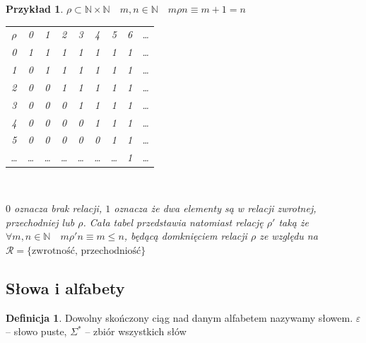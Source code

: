 \documentclass[12pt,a4paper]{article}
\newtheorem{przyklad}{Przykład}
\theoremstyle{definition}
\newtheorem{df}{Definicja}
\begin{document}
\begin{przyklad}
	$\rho \subset \mathbb{N}\times\mathbb{N} \quad m,n \in \mathbb{N} \quad m\rho n \equiv m +1 = n$ \\
	\begin{center}
	\begin{tabular}{ccccccccc}
		$\rho$ & 0 & 1 & 2 & 3 & 4 & 5 & 6 & \dots \\
			0  & {\color{red}1} & {\color{blue}1} & {\color{green}1}  & {\color{green}1}  & {\color{green}1}  & {\color{green}1}  & {\color{green}1}  & \dots \\
			1  & {\color{yellow}0}  & {\color{red}1}  & {\color{blue}1} & {\color{green}1}  & {\color{green}1}  & {\color{green}1}  & {\color{green}1}  & \dots \\
			2  & {\color{yellow}0}  & {\color{yellow}0}  & {\color{red}1}  & {\color{blue}1} & {\color{green}1}  &  {\color{green}1} & {\color{green}1}  & \dots \\
			3  & {\color{yellow}0}  & {\color{yellow}0}  & {\color{yellow}0}  & {\color{red}1}  & {\color{blue}1} & {\color{green}1}  & {\color{green}1}  & \dots \\
			4  & {\color{yellow}0}  & {\color{yellow}0}  & {\color{yellow}0}  & {\color{yellow}0}  & {\color{red}1}  & {\color{blue}1} & {\color{green}1}  & \dots \\
			5  & {\color{yellow}0}  & {\color{yellow}0}  & {\color{yellow}0}  & {\color{yellow}0}  & {\color{yellow}0}  & {\color{red}1}  & {\color{blue}1} & \dots \\
	     \dots & \dots  & \dots  & \dots  & \dots  & \dots  & \dots  & {\color{red}1}  & \dots \\
	\end{tabular}\\
	\end{center}	
	{\color{yellow} $0$ oznacza brak relacji}, $1$ oznacza że dwa elementy są w relacji {\color{red}zwrotnej}, {\color{green}przechodniej} lub {\color{blue}$\rho$}. 
	Cała tabel przedstawia natomiast relację $\rho'$ taką że $\forall m,n \in \mathbb{N} \quad m \rho' n \equiv m \leqslant n$,  będącą domknięciem relacji $\rho$ ze względu na 
	$\mathcal{R} = \{\text{zwrotność, przechodniość}\}$
\end{przyklad}

\subsection{Słowa i alfabety}
	\begin{df}
		Dowolny skończony ciąg nad danym alfabetem nazywamy słowem. $\varepsilon$ -- słowo puste, $\Sigma^*$ -- zbiór wszystkich słów
	\end{df}
	
\end{document}
